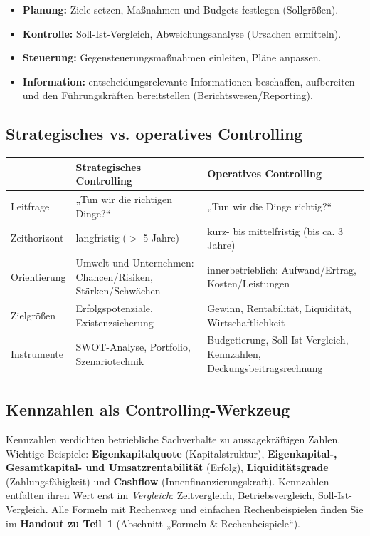 \documentclass[11pt, a4paper]{article}
\begin{document}
\begin{itemize}
  \item \textbf{Planung:} Ziele setzen, Maßnahmen und Budgets festlegen (Sollgrößen).
  \item \textbf{Kontrolle:} Soll-Ist-Vergleich, Abweichungsanalyse (Ursachen ermitteln).
  \item \textbf{Steuerung:} Gegensteuerungsmaßnahmen einleiten, Pläne anpassen.
  \item \textbf{Information:} entscheidungsrelevante Informationen beschaffen, aufbereiten
    und den Führungskräften bereitstellen (Berichtswesen/Reporting).
\end{itemize}

\subsection{Strategisches vs. operatives Controlling}

\begin{center}
\begin{tabular}{p{3.2cm} p{5.2cm} p{5.2cm}}
 & \textbf{Strategisches Controlling} & \textbf{Operatives Controlling}\\
\hline
Leitfrage & „Tun wir die richtigen Dinge?`` & „Tun wir die Dinge richtig?``\\
Zeithorizont & langfristig ($>$ 5 Jahre) & kurz- bis mittelfristig (bis ca. 3 Jahre)\\
Orientierung & Umwelt und Unternehmen: Chancen/Risiken, Stärken/Schwächen & innerbetrieblich:
Aufwand/Ertrag, Kosten/Leistungen\\
Zielgrößen & Erfolgspotenziale, Existenzsicherung & Gewinn, Rentabilität, Liquidität,
Wirtschaftlichkeit\\
Instrumente & SWOT-Analyse, Portfolio, Szenariotechnik & Budgetierung, Soll-Ist-Vergleich,
Kennzahlen, Deckungsbeitragsrechnung\\
\end{tabular}
\end{center}

\subsection{Kennzahlen als Controlling-Werkzeug}

Kennzahlen verdichten betriebliche Sachverhalte zu aussagekräftigen Zahlen. Wichtige
Beispiele: \textbf{Eigenkapitalquote} (Kapitalstruktur), \textbf{Eigenkapital-,
Gesamtkapital- und Umsatzrentabilität} (Erfolg), \textbf{Liquiditätsgrade}
(Zahlungsfähigkeit) und \textbf{Cashflow} (Innenfinanzierungskraft). Kennzahlen
entfalten ihren Wert erst im \emph{Vergleich}: Zeitvergleich, Betriebsvergleich,
Soll-Ist-Vergleich. Alle Formeln mit Rechenweg und einfachen Rechenbeispielen finden
Sie im \textbf{Handout zu Teil~1} (Abschnitt „Formeln \& Rechenbeispiele``).
\end{document}

